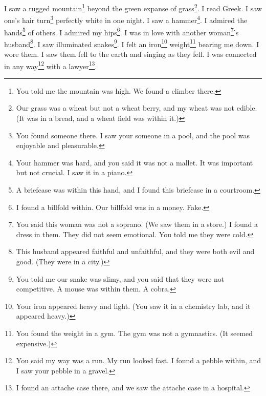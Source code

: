 \documentclass[12pt]{book}
\begin{document}
 I saw a rugged mountain\footnote{You told me the mountain was high. We found a climber there.} beyond the green expanse of grass\footnote{Our grass was a wheat but not a wheat berry, and my wheat was not edible. (It was in a bread, and a wheat field was within it.)}. I read Greek. I saw one's hair turn\footnote{You found someone there. I saw your someone in a pool, and the pool was enjoyable and pleasurable.} perfectly white in one night. I saw a hammer\footnote{Your hammer was hard, and you said it was not a mallet. It was important but not crucial. I saw it in a piano.}. I admired the hands\footnote{A briefcase was within this hand, and I found this briefcase in a courtroom.} of others. I admired my hips\footnote{I found a billfold within. Our billfold was in a money. Fake.}. I was in love with another woman\footnote{You said this woman was not a soprano. (We saw them in a store.) I found a dress in them. They did not seem emotional. You told me they were cold.}'s husband\footnote{This husband appeared faithful and unfaithful, and they were both evil and good. (They were in a city.)}. I saw illuminated snakes\footnote{You told me our snake was slimy, and you said that they were not competitive. A mouse was within them. A cobra.}. I felt an iron\footnote{Your iron appeared heavy and light. (You saw it in a chemistry lab, and it appeared heavy.)} weight\footnote{You found the weight in a gym. The gym was not a gymnastics. (It seemed expensive.)} bearing me down. I wore them. I saw them fell to the earth and singing as they fell. I was connected in any way\footnote{You said my way was a run. My run looked fast. I found a pebble within, and I saw your pebble in a gravel.} with a lawyer\footnote{I found an attache case there, and we saw the attache case in a hospital.}. 
\end{document}
